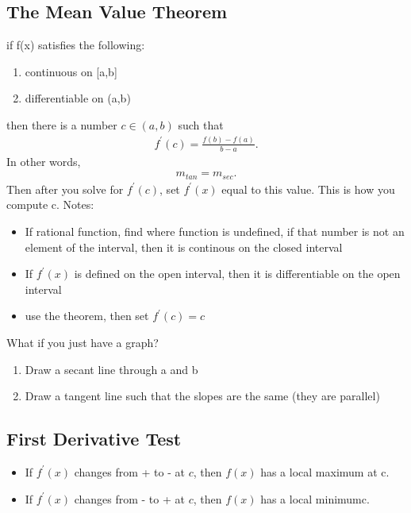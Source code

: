 \documentclass{report}
\begin{document}
     \bigbreak \noindent \bigbreak \noindent 
     \subsection{The Mean Value Theorem}
      \bigbreak \noindent 
     if f(x) satisfies the following:
     \begin{enumerate}
       \item continuous on [a,b]
        \item differentiable on (a,b)
     \end{enumerate}
     \smallbreak \noindent
     then there is a number $c \in (a,b)$ such that
     \begin{align*}
       f^{\prime}(c) = \frac{f(b) - f(a)}{b -a}
     .\end{align*}
     \bigbreak \noindent 
     In other words,
     \begin{align*}
       m_{tan} = m_{sec}
     .\end{align*}
     \bigbreak \noindent 
     Then after you solve for $f^{\prime}(c)$, set $f^{\prime}(x)$ equal to this value. This is how you compute c.
     \bigbreak \noindent \bigbreak \noindent
     Notes:
     \begin{itemize}
       \item If rational function, find where function is undefined, if that number is not an element of the interval, then it is continous on the closed interval
        \item If $f^{\prime}(x)$ is defined on the open interval, then it is differentiable on the open interval
        \item use the theorem, then set $f^{\prime}(c) = c$
     \end{itemize}

     \bigbreak \noindent 
     What if you just have a graph?
     \begin{enumerate}
       \item Draw a secant line through a and b
        \item Draw a tangent line such that the slopes are the same (they are parallel)
     \end{enumerate}

     \bigbreak \noindent \bigbreak \noindent 
     \subsection{First Derivative Test}
     \begin{itemize}
         \item  If $f^{\prime}(x)$ changes from + to - at $c$, then $f(x)$ has a local maximum at c.
        \item If $f^{\prime}(x)$ changes from - to + at $c$, then $f(x)$ has a local minimumc.
     \end{itemize}
\end{document}
